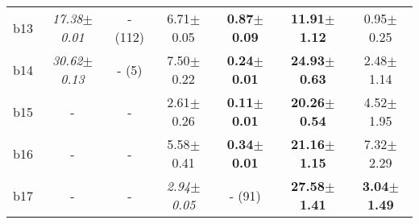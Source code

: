 \begin{longtable}{|l|c|c|c|c|c|c|}
\\
b13&\textit{17.38$\pm$0.01} & - (112)&6.71$\pm$0.05 & \textbf{0.87$\pm$0.09}&\textbf{11.91$\pm$1.12} & 0.95$\pm$0.25
\\
b14&\textit{30.62$\pm$0.13} & - (5)&7.50$\pm$0.22 & \textbf{0.24$\pm$0.01}&\textbf{24.93$\pm$0.63} & 2.48$\pm$1.14
\\
b15&- & -&2.61$\pm$0.26 & \textbf{0.11$\pm$0.01}&\textbf{20.26$\pm$0.54} & 4.52$\pm$1.95
\\
b16&- & -&5.58$\pm$0.41 & \textbf{0.34$\pm$0.01}&\textbf{21.16$\pm$1.15} & 7.32$\pm$2.29
\\
b17&- & -&\textit{2.94$\pm$0.05} & - (91)&\textbf{27.58$\pm$1.41} & \textbf{3.04$\pm$1.49}
\\
\hline
\end{longtable}
